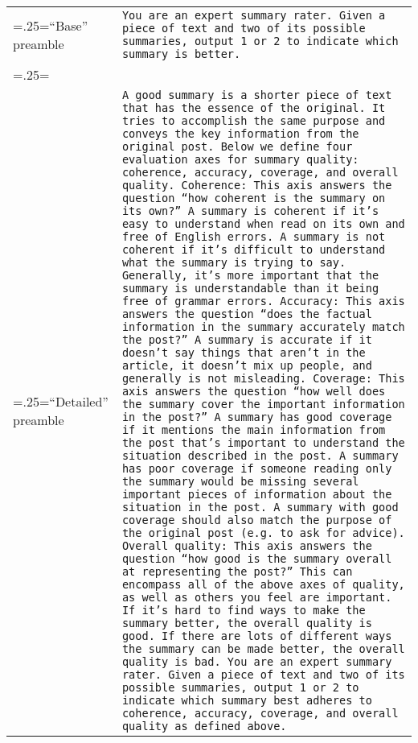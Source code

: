 \documentclass[11pt]{article}
\begin{document}
\begin{table*}[ht]
\small
    \centering
    \begin{tabularx}{\linewidth}{>{\hsize=.25\hsize\linewidth=\hsize}X|X}
    ``Base'' preamble & \texttt{You are an expert summary rater. Given a piece of text and two of its possible summaries, output 1 or 2 to indicate which summary is better.} \\
    \\
    ``Detailed'' preamble & \texttt{A good summary is a shorter piece of text that has the essence of the original. It tries to accomplish the same purpose and conveys the key information from the original post. Below we define four evaluation axes for summary quality: coherence, accuracy, coverage, and overall quality.
    \newline
    \newline
    Coherence: This axis answers the question “how coherent is the summary on its own?” A summary is coherent if it's easy to understand when read on its own and free of English errors. A summary is not coherent if it's difficult to understand what the summary is trying to say. Generally, it's more important that the summary is understandable than it being free of grammar errors.
    \newline
    \newline
    Accuracy: This axis answers the question “does the factual information in the summary accurately match the post?” A summary is accurate if it doesn't say things that aren't in the article, it doesn't mix up people, and generally is not misleading.
    \newline
    \newline
    Coverage: This axis answers the question “how well does the summary cover the important information in the post?” A summary has good coverage if it mentions the main information from the post that's important to understand the situation described in the post. A summary has poor coverage if someone reading only the summary would be missing several important pieces of information about the situation in the post. A summary with good coverage should also match the purpose of the original post (e.g. to ask for advice).
    \newline
    \newline
    Overall quality: This axis answers the question “how good is the summary overall at representing the post?” This can encompass all of the above axes of quality, as well as others you feel are important. If it's hard to find ways to make the summary better, the overall quality is good. If there are lots of different ways the summary can be made better, the overall quality is bad.
    \newline
    \newline
    You are an expert summary rater. Given a piece of text and two of its possible summaries, output 1 or 2 to indicate which summary best adheres to coherence, accuracy, coverage, and overall quality as defined above.} \\
    \end{tabularx}
    

\end{table*}
\end{document}
